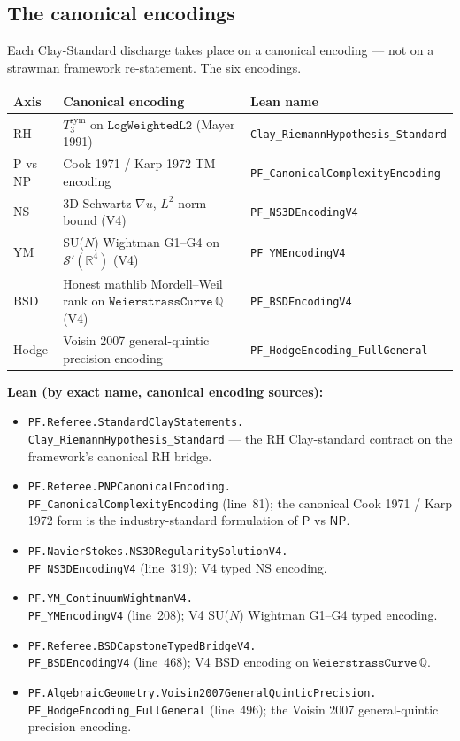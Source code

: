 \documentclass[11pt,a4paper]{article}
\theoremstyle{plain}
\theoremstyle{definition}
\begin{document}
\subsection{The canonical encodings}
\label{sec:canonical-encodings}

Each Clay-Standard discharge takes place on a canonical encoding ---
not on a strawman framework re-statement. The six encodings.

\begin{center}
\renewcommand{\arraystretch}{1.25}
\begin{tabular}{lll}
\toprule
\textbf{Axis} & \textbf{Canonical encoding} & \textbf{Lean name} \\
\midrule
RH & $T_3^{\mathrm{sym}}$ on $\mathtt{LogWeightedL2}$ (Mayer 1991) &
\texttt{Clay\_RiemannHypothesis\_Standard} \\
P vs NP & Cook 1971 / Karp 1972 TM encoding &
\texttt{PF\_CanonicalComplexityEncoding} \\
NS & 3D Schwartz $\nabla u$, $L^{2}$-norm bound (V4) &
\texttt{PF\_NS3DEncodingV4} \\
YM & SU($N$) Wightman G1--G4 on $\mathcal{S}'(\mathbb{R}^{4})$ (V4) &
\texttt{PF\_YMEncodingV4} \\
BSD & Honest mathlib Mordell--Weil rank on
$\mathtt{WeierstrassCurve}\, \mathbb{Q}$ (V4) &
\texttt{PF\_BSDEncodingV4} \\
Hodge & Voisin 2007 general-quintic precision encoding &
\texttt{PF\_HodgeEncoding\_FullGeneral} \\
\bottomrule
\end{tabular}
\end{center}

\noindent\textbf{Lean (by exact name, canonical encoding sources):}
\begin{itemize}[leftmargin=*,nosep]
\item \texttt{PF.Referee.StandardClayStatements.\\
  Clay\_RiemannHypothesis\_Standard} --- the RH Clay-standard
  contract on the framework's canonical RH bridge.
\item \texttt{PF.Referee.PNPCanonicalEncoding.\\
  PF\_CanonicalComplexityEncoding}
  (line~81); the canonical Cook 1971 / Karp 1972 form is the
  industry-standard formulation of $\mathsf{P}$ vs $\mathsf{NP}$.
\item \texttt{PF.NavierStokes.NS3DRegularitySolutionV4.\\
  PF\_NS3DEncodingV4}
  (line~319); V4 typed NS encoding.
\item \texttt{PF.YM\_ContinuumWightmanV4.\\
  PF\_YMEncodingV4}
  (line~208); V4 SU($N$) Wightman G1--G4 typed encoding.
\item \texttt{PF.Referee.BSDCapstoneTypedBridgeV4.\\
  PF\_BSDEncodingV4}
  (line~468); V4 BSD encoding on $\mathtt{WeierstrassCurve}\,
  \mathbb{Q}$.
\item \texttt{PF.AlgebraicGeometry.Voisin2007GeneralQuinticPrecision.\\
  PF\_HodgeEncoding\_FullGeneral}
  (line~496); the Voisin 2007 general-quintic precision encoding.
\end{itemize}
\end{document}
